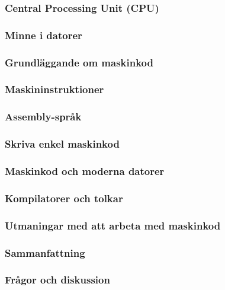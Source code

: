 \begin{frame}
    \frametitle{Central Processing Unit (CPU)}
\end{frame}

\begin{frame}
    \frametitle{Minne i datorer}
\end{frame}

\begin{frame}
    \frametitle{Grundläggande om maskinkod}
\end{frame}

\begin{frame}
    \frametitle{Maskininstruktioner}
\end{frame}

\begin{frame}
    \frametitle{Assembly-språk}
\end{frame}

\begin{frame}
    \frametitle{Skriva enkel maskinkod}
\end{frame}

\begin{frame}
    \frametitle{Maskinkod och moderna datorer}
\end{frame}

\begin{frame}
    \frametitle{Kompilatorer och tolkar}
\end{frame}

\begin{frame}
    \frametitle{Utmaningar med att arbeta med maskinkod}
\end{frame}

\begin{frame}
    \frametitle{Sammanfattning}
\end{frame}

\begin{frame}
    \frametitle{Frågor och diskussion}
\end{frame}